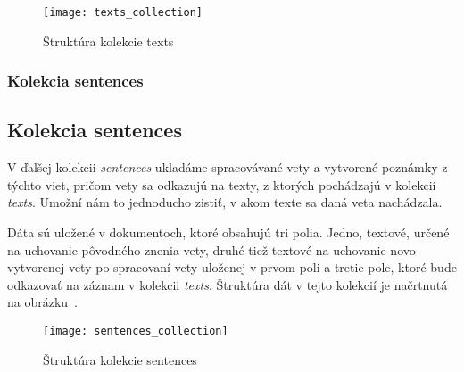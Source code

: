 \begin{figure}[H]
	\begin{center}\texttt{[image: texts\_collection]}\end{center}
	\caption[Štruktúra kolekcie texts]{Štruktúra kolekcie texts}\label{fig:texts_collection_structure}
\end{figure}

%
%
{
	\subsubsection{Kolekcia sentences}
}
{
	\subsection{Kolekcia sentences}
}
V ďalšej kolekcii \textit{sentences} ukladáme spracovávané vety a vytvorené poznámky z týchto viet, pričom vety sa odkazujú na texty, z ktorých pochádzajú v kolekcií \textit{texts}. Umožní nám to jednoducho zistiť, v akom texte sa daná veta nachádzala.

Dáta sú uložené v dokumentoch, ktoré obsahujú tri polia. Jedno, textové, určené na uchovanie pôvodného znenia vety, druhé tiež textové na uchovanie novo vytvorenej vety po spracovaní vety uloženej v prvom poli a tretie pole, ktoré bude odkazovať na záznam v kolekcii \textit{texts}. Štruktúra dát v tejto kolekcií je načrtnutá na obrázku~.

\begin{figure}[H]
	\begin{center}\texttt{[image: sentences\_collection]}\end{center}
	\caption[Štruktúra kolekcie sentences]{Štruktúra kolekcie sentences}\label{fig:sentences_collection_structure}
\end{figure}

